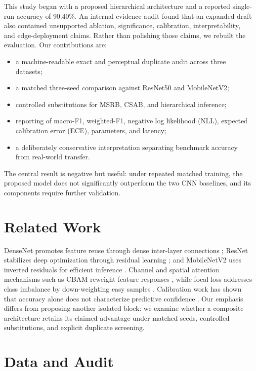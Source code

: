 \documentclass[journal]{IEEEtran}
\begin{document}
This study began with a proposed hierarchical architecture and a reported single-run accuracy of 90.40\%. An internal evidence audit found that an expanded draft also contained unsupported ablation, significance, calibration, interpretability, and edge-deployment claims. Rather than polishing those claims, we rebuilt the evaluation. Our contributions are:
\begin{itemize}
\item a machine-readable exact and perceptual duplicate audit across three datasets;
\item a matched three-seed comparison against ResNet50 and MobileNetV2;
\item controlled substitutions for MSRB, CSAB, and hierarchical inference;
\item reporting of macro-F1, weighted-F1, negative log likelihood (NLL), expected calibration error (ECE), parameters, and latency;
\item a deliberately conservative interpretation separating benchmark accuracy from real-world transfer.
\end{itemize}
The central result is negative but useful: under repeated matched training, the proposed model does not significantly outperform the two CNN baselines, and its components require further validation.

\section{Related Work}
DenseNet promotes feature reuse through dense inter-layer connections \cite{densenet}; ResNet stabilizes deep optimization through residual learning \cite{resnet}; and MobileNetV2 uses inverted residuals for efficient inference \cite{mobilenetv2}. Channel and spatial attention mechanisms such as CBAM reweight feature responses \cite{cbam}, while focal loss addresses class imbalance by down-weighting easy samples \cite{focal}. Calibration work has shown that accuracy alone does not characterize predictive confidence \cite{calibration}. Our emphasis differs from proposing another isolated block: we examine whether a composite architecture retains its claimed advantage under matched seeds, controlled substitutions, and explicit duplicate screening.

\section{Data and Audit}
\end{document}
